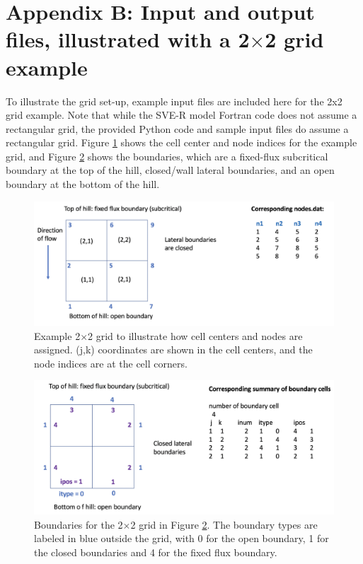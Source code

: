 \documentclass{article}
\newcommand{\code}[1]{\texttt{#1}}
\begin{document}
\section{Appendix B: Input and output files, illustrated with a 2$\times$2 grid example}



%	
	 

To illustrate the grid set-up, example input files are included here for the 2x2 grid example.  Note that while the SVE-R model Fortran code does not assume a  rectangular grid, the provided Python code and sample input files do assume a rectangular grid. 
 Figure \ref{2by2} shows the cell center and node indices for the example grid, and Figure \ref{2by2boundary} shows the boundaries, which are a fixed-flux subcritical boundary at the top of the hill, closed/wall lateral boundaries, and an open boundary at the bottom of the hill.


 \begin{figure}[h]
 \centering
\includegraphics[width=30pc]{grid/2by2nodes.png}
 \caption{Example 2$\times$2 grid to illustrate how cell centers and nodes are assigned.  (j,k) coordinates are shown in the cell centers, and the node indices are at the cell corners. }
 \label{2by2}
 \end{figure}
 
 \begin{figure}[h]
 \centering
\includegraphics[width=30pc]{grid/2by2boundary.png}
 \caption{Boundaries for the 2$\times$2 grid in Figure \ref{2by2boundary}. The boundary types are labeled in blue outside the grid, with 0 for the open boundary, 1 for the closed boundaries and 4 for the fixed flux boundary.  }
 \label{2by2boundary}
 \end{figure}
 
\end{document}
